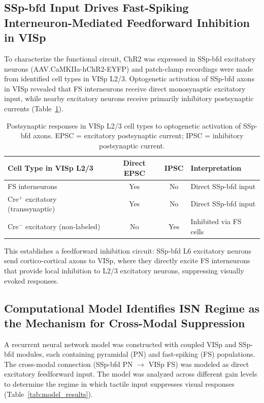 \documentclass[11pt]{article}
\begin{document}
\subsection{SSp-bfd Input Drives Fast-Spiking Interneuron-Mediated Feedforward Inhibition in VISp}

To characterize the functional circuit, ChR2 was expressed in SSp-bfd excitatory neurons (AAV.CaMKIIa-hChR2-EYFP) and patch-clamp recordings were made from identified cell types in VISp L2/3. Optogenetic activation of SSp-bfd axons in VISp revealed that FS interneurons receive direct monosynaptic excitatory input, while nearby excitatory neurons receive primarily inhibitory postsynaptic currents (Table~\ref{tab:ephys}).

\begin{table}[H]
\centering
\caption{Postsynaptic responses in VISp L2/3 cell types to optogenetic activation of SSp-bfd axons. EPSC = excitatory postsynaptic current; IPSC = inhibitory postsynaptic current.}
\label{tab:ephys}
\begin{tabular}{lccl}
\toprule
\textbf{Cell Type in VISp L2/3} & \textbf{Direct EPSC} & \textbf{IPSC} & \textbf{Interpretation} \\
\midrule
FS interneurons & Yes & No & Direct SSp-bfd input \\
Cre$^+$ excitatory (transsynaptic) & Yes & No & Direct SSp-bfd input \\
Cre$^-$ excitatory (non-labeled) & No & Yes & Inhibited via FS cells \\
\bottomrule
\end{tabular}
\end{table}

This establishes a feedforward inhibition circuit: SSp-bfd L6 excitatory neurons send cortico-cortical axons to VISp, where they directly excite FS interneurons that provide local inhibition to L2/3 excitatory neurons, suppressing visually evoked responses.

\subsection{Computational Model Identifies ISN Regime as the Mechanism for Cross-Modal Suppression}

A recurrent neural network model was constructed with coupled VISp and SSp-bfd modules, each containing pyramidal (PN) and fast-spiking (FS) populations. The cross-modal connection (SSp-bfd PN $\rightarrow$ VISp FS) was modeled as direct excitatory feedforward input. The model was analyzed across different gain levels to determine the regime in which tactile input suppresses visual responses (Table~\ref{tab:model_results}).
\end{document}
